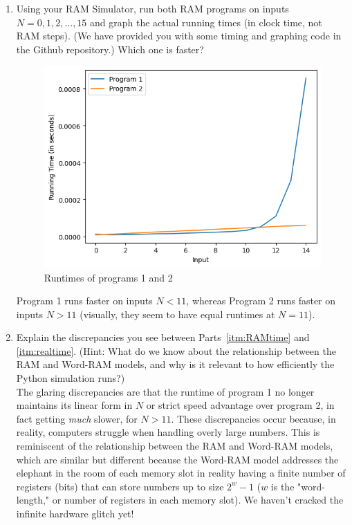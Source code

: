 \documentclass[11pt]{article}
\begin{document}
\begin{enumerate}
\begin{enumerate}
    \item Using your RAM Simulator, run both RAM programs on inputs $N=0,1,2,\ldots,15$ and graph the actual running times (in clock time, not RAM steps).  (We have provided you with some timing and graphing code in the Github repository.) Which one is faster?  \label{itm:realtime}  \\

    \begin{figure}[H]
        \centering
        \includegraphics[width=0.75\linewidth]{running_times.png}
        \caption{Runtimes of programs 1 and 2}
        \label{fig:enter-label}
    \end{figure}
    Program 1 runs faster on inputs $N < 11$, whereas Program 2 runs faster on inputs $N > 11$ (visually, they seem to have equal runtimes at $N=11$). \\
    
    \item Explain the discrepancies you see between Parts~\ref{itm:RAMtime} and \ref{itm:realtime}.  (Hint: What do we know about the relationship between the RAM and Word-RAM models, and why is it relevant to how efficiently the Python simulation runs?) \\

    The glaring discrepancies are that the runtime of program 1 no longer maintains its linear form in $N$ or strict speed advantage over program 2, in fact getting \textit{much} slower, for $N > 11$. These discrepancies occur because, in reality, computers struggle when handling overly large numbers. This is reminiscent of the relationship between the RAM and Word-RAM models, which are similar but different because the Word-RAM model addresses the elephant in the room of each memory slot in reality having a finite number of registers (bits) that can store numbers up to size $2^w - 1$ ($w$ is the "word-length," or number of registers in each memory slot). We haven't cracked the infinite hardware glitch yet! \\


\end{enumerate}
\end{enumerate}
\end{document}
